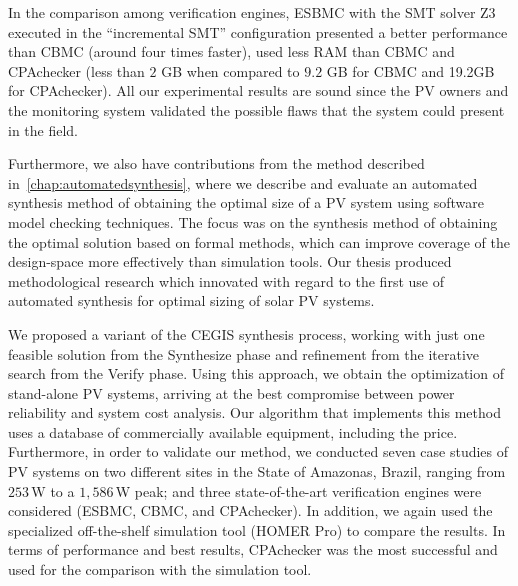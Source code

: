 %
In the comparison among verification engines, ESBMC with the SMT solver Z3 executed in the ``incremental SMT'' configuration presented a better performance than CBMC (around four times faster), used less RAM than CBMC and CPAchecker (less than $2$ GB when compared to $9.2$ GB for CBMC and 19.2GB for CPAchecker). All our experimental results are sound since the PV owners and the monitoring system validated the possible flaws that the system could present in the field.

Furthermore, we also have contributions from the method described in~\autoref{chap:automatedsynthesis}, where we describe and evaluate an automated synthesis method of obtaining the optimal size of a PV system using software model checking techniques. The focus was on the synthesis method of obtaining the optimal solution based on formal methods, which can improve coverage of the design-space more effectively than simulation tools. Our thesis produced methodological research which innovated with regard to the first use of automated synthesis for optimal sizing of solar PV systems.

We proposed a variant of the CEGIS synthesis process, working with just one feasible solution from the {\sc Synthesize} phase and refinement from the iterative search from the {\sc Verify} phase. Using this approach, we obtain the optimization of stand-alone PV systems, arriving at the best compromise between power reliability and system cost analysis. Our algorithm that implements this method uses a database of commercially available equipment, including the price. Furthermore, in order to validate our method, we conducted seven case studies of PV systems on two different sites in the State of Amazonas, Brazil, ranging from $253$\,W to a $1,586$\,W peak; and three state-of-the-art verification engines were considered (ESBMC, CBMC, and CPAchecker). In addition, we again used the specialized off-the-shelf simulation tool (HOMER Pro) to compare the results. In terms of performance and best results, CPAchecker was the most successful and used for the comparison with the simulation tool.

